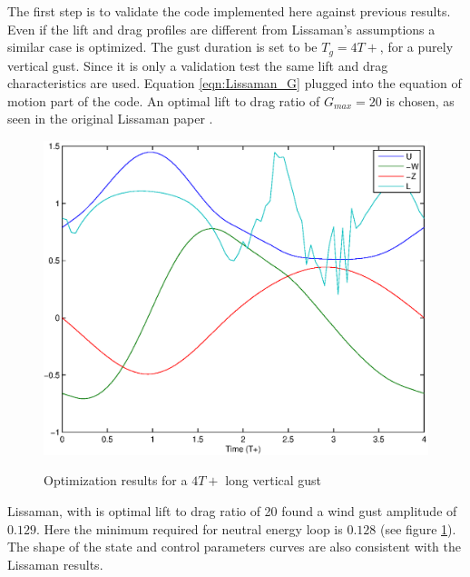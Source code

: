      \label{sec:results}

    The first step is to validate the code implemented here against previous results. 
    Even if the lift and drag profiles are different from Lissaman's assumptions a similar case is optimized.
    The gust duration is set to be $T_g=4 T+$, for a purely vertical gust.
    Since it is only a validation test the same lift and drag characteristics are used. Equation \ref{eqn:Lissaman_G} plugged into the equation of motion part of the code. An optimal lift to drag ratio of $G_{max}=20$ is chosen, as seen in the original Lissaman paper \cite{Lissaman2007neutral}.

    \begin{figure}[ht]
      \begin{center}	
	\scalebox{0.8}
	{\includegraphics{./Figures/Windtype=1_Tg=4_Wg=0p129_quad_G=20.eps}}
      \end{center}
      \caption{Optimization results for a $4T+$ long vertical gust}
      \label{fig:Validation_optimization}
    \end{figure}

    \FloatBarrier

    Lissaman, with is optimal lift to drag ratio of 20 found a wind gust amplitude of $0.129$. 
    Here the minimum required for neutral energy loop is $0.128$ (see figure \ref{fig:Validation_optimization}).
    The shape of the state and control parameters curves are also consistent with the Lissaman results.

